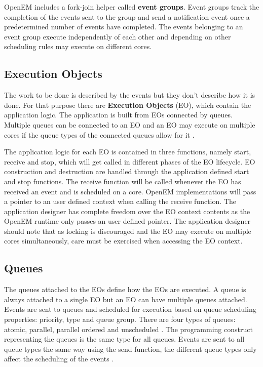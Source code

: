OpenEM includes a fork-join helper called \textbf{event groups}. Event groups track the completion of the events sent to the group and send a notification event once a predetermined number of events have completed. The events belonging to an event group execute independently of each other and depending on other scheduling rules may execute on different cores. \cite{openemintro}

\subsection{Execution Objects}
\label{subsec:eos}
The work to be done is described by the events but they don't describe how it is done. For that purpose there are \textbf{Execution Objects} (EO), which contain the application logic. The application is built from EOs connected by queues. Multiple queues can be connected to an EO and an EO may execute on multiple cores if the queue types of the connected queues allow for it . \cite{openemintro}

The application logic for each EO is contained in three functions, namely start, receive and stop, which will get called in different phases of the EO lifecycle. EO construction and destruction are handled through the application defined start and stop functions. The receive function will be called whenever the EO has received an event and is scheduled on a core. \cite{openemintro} OpenEM implementations will pass a pointer to an user defined context when calling the receive function. The application designer has complete freedom over the EO context contents as the OpenEM runtime only passes an user defined pointer. \cite{openemintro} The application designer should note that as locking is discouraged and the EO may execute on multiple cores simultaneously, care must be exercised when accessing the EO context.

\subsection{Queues}
\label{subsec:queues}
The queues attached to the EOs define how the EOs are executed. A queue is always attached to a single EO but an EO can have multiple queues attached. Events are sent to queues and scheduled for execution based on queue scheduling properties: priority, type and queue group. \cite{openemintro} There are four types of queues: atomic, parallel, parallel ordered and unscheduled \cite{openemintro}. The programming construct representing the queues is the same type for all queues. Events are sent to all queue types the same way using the send function, the different queue types only affect the scheduling of the events \cite{openemintro}.

